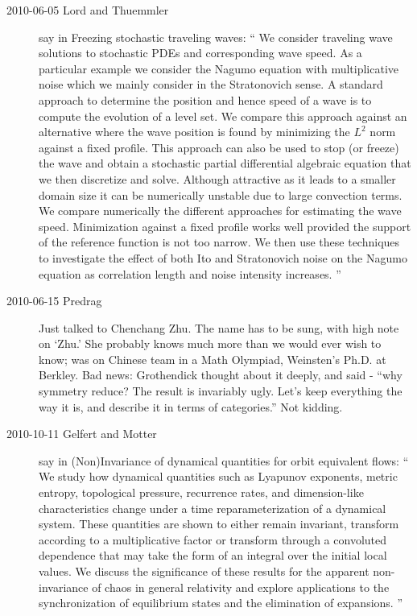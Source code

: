 \begin{description}
\item[2010-06-05 Lord and Thuemmler]
say in 
{Freezing stochastic traveling waves}:
``
 We consider traveling wave solutions to stochastic
PDEs and corresponding wave speed. As a particular example we
consider the Nagumo equation with multiplicative noise which we mainly consider
in the Stratonovich sense. A standard approach to determine the position and
hence speed of a wave is to compute the evolution of a level set. We compare
this approach against an alternative where the wave position is found by
minimizing the $L^2$ norm against a fixed profile. This approach can also be
used to stop (or freeze) the wave and obtain a stochastic partial differential
algebraic equation that we then discretize and solve. Although attractive as it
leads to a smaller domain size it can be numerically unstable due to large
convection terms. We compare numerically the different approaches for
estimating the wave speed. Minimization against a fixed profile works well
provided the support of the reference function is not too narrow. We then use
these techniques to investigate the effect of both Ito and Stratonovich noise
on the Nagumo equation as correlation length and noise intensity increases.
''

\item[2010-06-15 Predrag] Just talked to
{Chenchang Zhu}. The name has to be sung, with high note on `Zhu.'
She probably knows much more than we would ever wish to know;
was on Chinese team in a Math Olympiad, Weinsten's Ph.D. at Berkley.
Bad news: Grothendick thought about it deeply, and said
													\toCB
 - ``why
symmetry reduce? The result is invariably ugly. Let's keep everything
the way it is, and describe it in terms of categories.'' Not kidding.

\item[2010-10-11 Gelfert and Motter] say in
 {(Non)Invariance}  of dynamical
quantities for orbit equivalent flows: `` We study how dynamical
quantities such as Lyapunov exponents, metric entropy, topological
pressure, recurrence rates, and dimension-like characteristics change
under a time reparameterization of a dynamical system. These quantities
are shown to either remain invariant, transform according to a
multiplicative factor or transform through a convoluted dependence that
may take the form of an integral over the initial local values. We
discuss the significance of these results for the apparent non-invariance
of chaos in general relativity and explore applications to the
synchronization of equilibrium states and the elimination of expansions.
''


\end{description}

